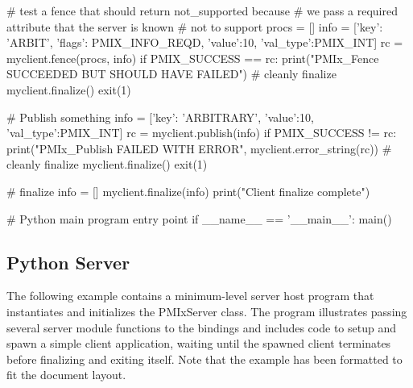 \begin{codepar}
    # test a fence that should return not_supported because
    # we pass a required attribute that the server is known
    # not to support
    procs = []
    info = [{'key': 'ARBIT', 'flags': PMIX_INFO_REQD,
             'value':10, 'val_type':PMIX_INT}]
    rc = myclient.fence(procs, info)
    if PMIX_SUCCESS == rc:
        print("PMIx_Fence SUCCEEDED BUT SHOULD HAVE FAILED")
        # cleanly finalize
        myclient.finalize()
        exit(1)

    # Publish something
    info = [{'key': 'ARBITRARY', 'value':10, 'val_type':PMIX_INT}]
    rc = myclient.publish(info)
    if PMIX_SUCCESS != rc:
        print("PMIx_Publish FAILED WITH ERROR",
              myclient.error_string(rc))
        # cleanly finalize
        myclient.finalize()
        exit(1)

    # finalize
    info = []
    myclient.finalize(info)
    print("Client finalize complete")

# Python main program entry point
if __name__ == '__main__':
    main()
\end{codepar}
\pyspecificend

\subsection{Python Server}

The following example contains a minimum-level server host program that instantiates and initializes the PMIxServer class. The program illustrates passing several server module functions to the bindings and includes code to setup and spawn a simple client application, waiting until the spawned client terminates before finalizing and exiting itself. Note that the example has been formatted to fit the document layout.

